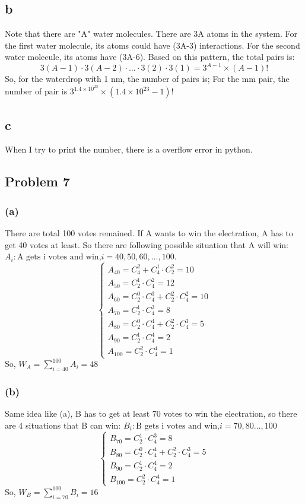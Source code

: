 \documentclass[a4paper]{article}
\begin{document}
\subsection{b}
Note that there are "A" water molecules. There are 3A atoms in the system. For the first water molecule, its atoms could have (3A-3) interactions. For the second water molecule, its atoms have (3A-6). Based on this pattern, the total pairs is:
\begin{equation}
	3(A-1) \cdot 3(A-2) \cdot \dots \cdot 3(2) \cdot 3(1)=3^{A-1} \times (A-1)!
\end{equation}
So, for the waterdrop with 1 nm, the number of pairs is; For the mm pair, the number of pair is $3^{1.4 \times 10^{23}} \times (1.4 \times 10^{23}-1)!$

\subsection{c}
When I try to print the number, there is a overflow error in python.

\subsection{Problem 7}
\subsubsection{(a)}
There are total 100 votes remained. If A wants to win the electration, A has to get 40 votes at least. So there are following possible situation that A will win: $A_{i}:\text{A gets i votes and win,} i={40,50,60, \dots, 100}$.
$$
\begin{cases}
	A_{40}=C_{4}^{2}+C_{4}^{1} \cdot C_{2}^{2}=10 \\
	A_{50}=C_{2}^{1} \cdot C_{4}^{2}=12 \\
	A_{60}=C_{2}^{0} \cdot C_{4}^{3} + C_{2}^{2} \cdot C_{4}^{2}=10 \\
	A_{70}=C_{2}^{1} \cdot C_{4}^{3}=8 \\
	A_{80}=C_{2}^{0} \cdot C_{4}^{4} + C_{2}^{2} \cdot C_{4}^{3}=5 \\
	A_{90}=C_{2}^{1} \cdot C_{4}^{4}=2 \\
	A_{100}=C_{2}^{2} \cdot C_{4}^{4}=1
\end{cases}
$$
So, $W_{A}=\sum_{i=40}^{100} A_{i}=48$

\subsubsection{(b)}
Same idea like (a), B has to get at least 70 votes to win the electration, so there are 4 situations that B can win: $B_{i}:\text{B gets i votes and win,} i={70, 80 \dots, 100}$
$$
\begin{cases}
	B_{70}=C_{2}^{1} \cdot C_{4}^{3}=8 \\
	B_{80}=C_{2}^{0} \cdot C_{4}^{4} + C_{2}^{2} \cdot C_{4}^{3}=5 \\
	B_{90}=C_{2}^{1} \cdot C_{4}^{4}=2 \\
	B_{100}=C_{2}^{2} \cdot C_{4}^{4}=1
\end{cases}
$$
So, $W_{B}=\sum_{i=70}^{100} B_{i}=16$
\end{document}
